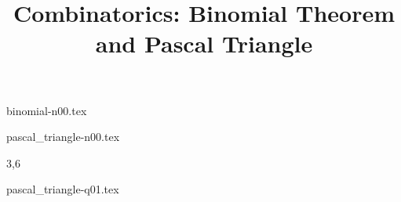 \documentclass[a4paper,12pt]{article}
\begin{document}
\title{Combinatorics: Binomial Theorem and Pascal Triangle}
\newcommand\event{S.3,4 Elite Mathematics Training}
\newcommand\learningobjective{
\item Learn Binomial Theorem
\item Learn Pascal Triangle and its property
}

\myfrontpage

{binomial-n00.tex}

{pascal_triangle-n00.tex}

\begin{question}[]{3,6}
    
    
    
    
    
    {pascal_triangle-q01.tex}
    
    
\end{question}
\end{document}
